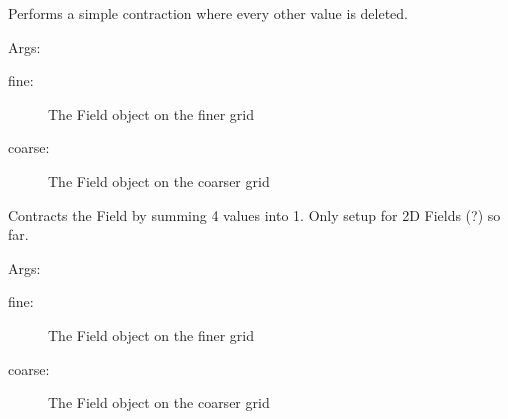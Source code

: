\documentclass[letterpaper,10pt,english]{sphinxmanual}
\begin{document}
\begin{fulllineitems}
\label{\detokenize{autoapi/Contractinator/index:Contractinator.simple}}
\sphinxAtStartPar
Performs a simple contraction where every other value is deleted.

\sphinxAtStartPar
Args:
\begin{description}
\item[{fine:}] \leavevmode
\sphinxAtStartPar
The Field object on the finer grid

\item[{coarse:}] \leavevmode
\sphinxAtStartPar
The Field object on the coarser grid

\end{description}

\end{fulllineitems}


\begin{fulllineitems}
\label{\detokenize{autoapi/Contractinator/index:Contractinator.sum4way}}
\sphinxAtStartPar
Contracts the Field by summing 4 values into 1. Only setup for 2D Fields (?) so far.

\sphinxAtStartPar
Args:
\begin{description}
\item[{fine:}] \leavevmode
\sphinxAtStartPar
The Field object on the finer grid

\item[{coarse:}] \leavevmode
\sphinxAtStartPar
The Field object on the coarser grid

\end{description}

\end{fulllineitems}

\end{document}
